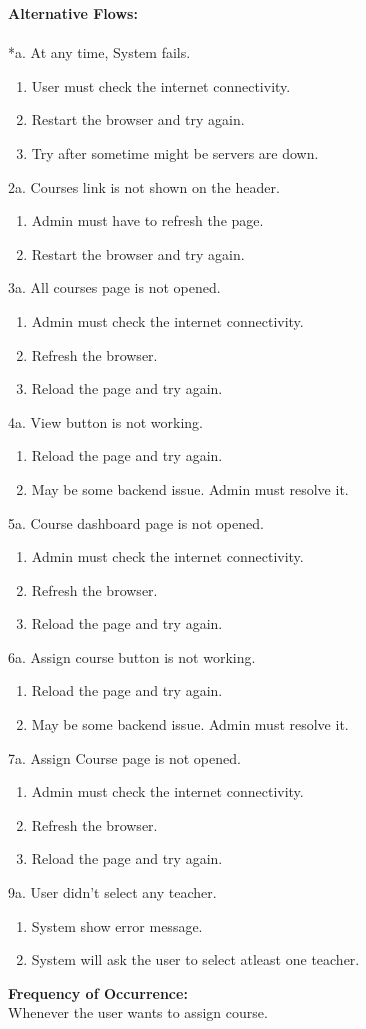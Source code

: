 \documentclass[12pt]{article}
\begin{document}
\textbf{Alternative Flows:}\\
\\
*a. At any time, System fails.
\begin{enumerate}
\item User must check the internet connectivity.
\item Restart the browser and try again.
\item Try after sometime might be servers are down.
\end{enumerate}
2a. Courses link is not shown on the header.
\begin{enumerate}
\item Admin must have to refresh the page.
\item Restart the browser and try again.
\end{enumerate} 
3a. All courses page is not opened.
\begin{enumerate}
\item Admin must check the internet connectivity.
\item Refresh the browser.
\item Reload the page and try again.
\end{enumerate}
4a. View button is not working.
\begin{enumerate}
\item Reload the page and try again.
\item May be some backend issue. Admin must resolve it.
\end{enumerate}
5a. Course dashboard page is not opened.
\begin{enumerate}
\item Admin must check the internet connectivity.
\item Refresh the browser.
\item Reload the page and try again.
\end{enumerate}
6a. Assign course button is not working.
\begin{enumerate}
\item Reload the page and try again.
\item May be some backend issue. Admin must resolve it.
\end{enumerate}
7a. Assign Course page is not opened.
\begin{enumerate}
\item Admin must check the internet connectivity.
\item Refresh the browser.
\item Reload the page and try again.
\end{enumerate}
9a. User didn't select any teacher.
\begin{enumerate}
\item System show error message.
\item System will ask the user to select atleast one teacher.
\end{enumerate}
\textbf{Frequency of Occurrence:}\\
Whenever the user wants to assign course.
\end{document}

